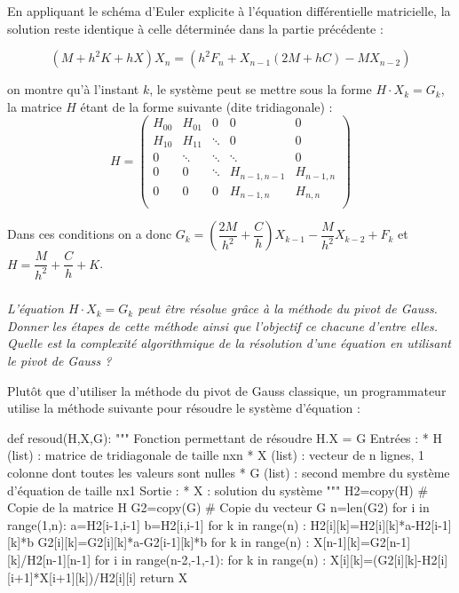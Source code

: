 \documentclass[10pt]{article}
\newif\ifprof
\begin{document}
En appliquant le schéma d'Euler explicite à l'équation différentielle matricielle, la solution reste identique à celle déterminée dans la partie précédente :

$$
\left(M +h^2K+hX\right)X_{n}= \left(h^2F_n +X_{n-1}(2M+hC) -MX_{n-2} \right)
$$ 
 
on montre qu'à l'instant $k$, le système peut se mettre sous la forme $H\cdot X_k = G_k$, la matrice $H$ étant de la forme suivante (dite tridiagonale) :
$$
H =
\begin{pmatrix}
H_{00}  & H_{01} &  0 & 0 & 0 \\
H_{10}  & H_{11} &  \ddots & 0 & 0 \\
0 & \ddots & \ddots & \ddots & 0 \\
0 & 0 & \ddots & H_{n-1,n-1} & H_{n-1,n} \\
0 & 0 & 0 & H_{n-1,n} & H_{n,n} \\
\end{pmatrix}
 $$

\begin{rem}
Dans ces conditions on a donc  $G_k = \left(\dfrac{2M}{h^2}+\dfrac{C}{h} \right)X_{k-1} - \dfrac{M}{h^2} X_{k-2} + F_k $ et $H = \dfrac{M}{h^2} + \dfrac{C}{h} + K$.
\end{rem}

\subparagraph{}
\textit{L'équation  $H\cdot X_k = G_k$ peut être résolue grâce à la méthode du pivot de Gauss. Donner les étapes de cette méthode ainsi que l'objectif ce chacune d'entre elles. Quelle est la complexité algorithmique de la résolution d'une équation en utilisant le pivot de Gauss ?}
\ifprof
\begin{corrige}
\end{corrige}
\else
\fi


Plutôt que d'utiliser la méthode du pivot de Gauss classique, un programmateur utilise la méthode suivante pour résoudre le système d'équation : 
\begin{py}
\begin{python}
def resoud(H,X,G):
    """
    Fonction permettant de résoudre H.X = G
    Entrées : 
        * H (list) : matrice de tridiagonale de taille nxn
        * X (list) : vecteur de n lignes, 1 colonne dont toutes les valeurs sont nulles
        * G (list) : second membre du système d'équation de taille nx1
    Sortie : 
        * X : solution du système
    """
    H2=copy(H)  # Copie de la matrice H
    G2=copy(G)  # Copie du vecteur G
    n=len(G2)
    for i in range(1,n):
        a=H2[i-1,i-1]
        b=H2[i,i-1]
        for k in range(n) :
            H2[i][k]=H2[i][k]*a-H2[i-1][k]*b
            G2[i][k]=G2[i][k]*a-G2[i-1][k]*b
    for k in range(n) :
        X[n-1][k]=G2[n-1][k]/H2[n-1][n-1]
    for i in range(n-2,-1,-1):
        for k in range(n) :
            X[i][k]=(G2[i][k]-H2[i][i+1]*X[i+1][k])/H2[i][i]
    return X

\end{python}
\end{py}
\end{document}
